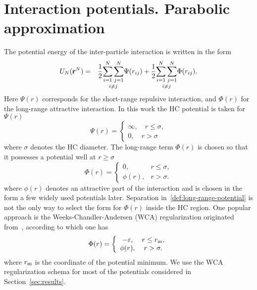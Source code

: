 \section{\label{sec:parab_pot} Interaction potentials. Parabolic approximation}
The potential energy of the inter-particle interaction is written in the form
\begin{eqnarray*}
	U_N(\vb r^N) &=& \frac12 \underset{i\neq j}{\sum_{i=1}^N \sum_{j=1}^N} \Psi(r_{ij}) 
	+ \frac12 \underset{i\neq j}{\sum_{i=1}^N \sum_{j=1}^N} \Phi(r_{ij}).	
\end{eqnarray*}
Here $\Psi(r)$ corresponds for the short-range repulsive interaction, and $\Phi(r)$ for the long-range attractive interaction. In this work the HC potential is taken for $\Psi(r)$
\begin{equation*}
	\Psi(r) = 
	\left\{
	\begin{array}{cc}
		\infty, \quad r\leq \sigma, \\
		0, \quad r > \sigma
	\end{array}
	\right.
\end{equation*}
where $\sigma$ denotes the HC diameter. The long-range term $\Phi(r)$ is chosen so that it possesses a potential well at $r \geq \sigma$
\begin{equation}
	\label{def:long-range-potential}
	\Phi(r) = \left\{
	\begin{array}{cc}
		0, & r \leq \sigma, 
		\\
		\phi(r), & r > \sigma.
	\end{array}
	\right.
\end{equation}
where $\phi(r)$ denotes an attractive part of the interaction and is chosen in the form a few widely used potentials later.
Separation in~\eqref{def:long-range-potential} is not the only way to select the form for $\Phi(r)$ inside the HC region. One popular approach is the Weeks-Chandler-Andersen (WCA) regularization originated from~\cite{WCA1971}, according to which one has
\begin{equation}
	\label{def:long-range-potential_wca}
	\Phi(r) = \left\{
	\begin{array}{cc}
		-\varepsilon, & r \leq r_{\rm m}, 
		\\
		\phi(r), & r > \sigma.
	\end{array}
	\right.
\end{equation}
where $r_{\rm m}$ is the coordinate of the potential minimum. We use the WCA regularization schema for most of the potentials considered in Section~\ref{sec:results}.

